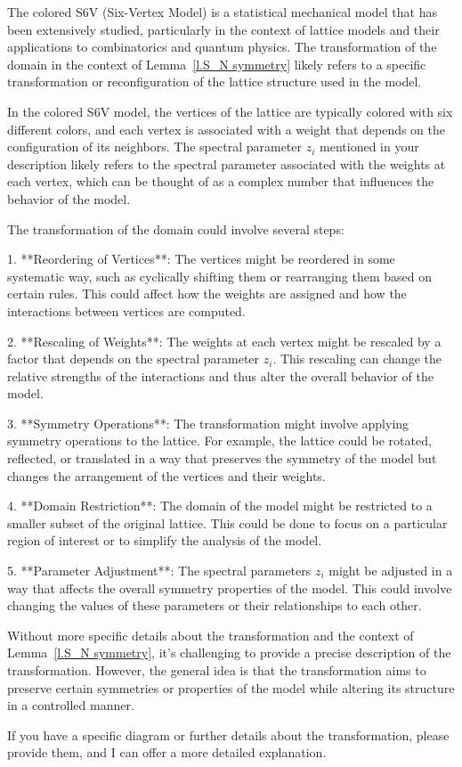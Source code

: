 The colored S6V (Six-Vertex Model) is a statistical mechanical model that has been extensively studied, particularly in the context of lattice models and their applications to combinatorics and quantum physics. The transformation of the domain in the context of Lemma~\ref{l.S_N symmetry} likely refers to a specific transformation or reconfiguration of the lattice structure used in the model.

In the colored S6V model, the vertices of the lattice are typically colored with six different colors, and each vertex is associated with a weight that depends on the configuration of its neighbors. The spectral parameter \( z_i \) mentioned in your description likely refers to the spectral parameter associated with the weights at each vertex, which can be thought of as a complex number that influences the behavior of the model.

The transformation of the domain could involve several steps:

1. **Reordering of Vertices**: The vertices might be reordered in some systematic way, such as cyclically shifting them or rearranging them based on certain rules. This could affect how the weights are assigned and how the interactions between vertices are computed.

2. **Rescaling of Weights**: The weights at each vertex might be rescaled by a factor that depends on the spectral parameter \( z_i \). This rescaling can change the relative strengths of the interactions and thus alter the overall behavior of the model.

3. **Symmetry Operations**: The transformation might involve applying symmetry operations to the lattice. For example, the lattice could be rotated, reflected, or translated in a way that preserves the symmetry of the model but changes the arrangement of the vertices and their weights.

4. **Domain Restriction**: The domain of the model might be restricted to a smaller subset of the original lattice. This could be done to focus on a particular region of interest or to simplify the analysis of the model.

5. **Parameter Adjustment**: The spectral parameters \( z_i \) might be adjusted in a way that affects the overall symmetry properties of the model. This could involve changing the values of these parameters or their relationships to each other.

Without more specific details about the transformation and the context of Lemma~\ref{l.S_N symmetry}, it's challenging to provide a precise description of the transformation. However, the general idea is that the transformation aims to preserve certain symmetries or properties of the model while altering its structure in a controlled manner.

If you have a specific diagram or further details about the transformation, please provide them, and I can offer a more detailed explanation.